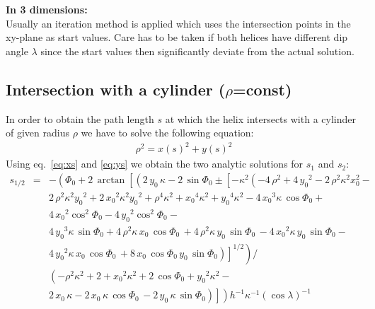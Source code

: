 \documentclass[twoside]{article}
\begin{document}
\begin{description}
{\bf In 3 dimensions:}\\
Usually an iteration method is applied which uses the intersection
points in the xy-plane as start values. Care has to be taken if both
helices have different dip angle $\lambda$ since the start values then
significantly deviate from the actual solution.

\subsection{Intersection with a cylinder ($\rho$=const)}

In order to obtain the path length $s$ at which the helix
intersects with a cylinder of given radius $\rho$ we have to solve
the following equation:
\begin{eqnarray}
    \rho^2 = x(s)^2 + y(s)^2
\end{eqnarray}
Using eq.~\ref{eq:xs} and \ref{eq:ys} we obtain the two analytic solutions for $s_1$ and $s_2$:
\begin{eqnarray} \label{eq:rsolve}
    s_{1/2} &=& -\left({\Phi_0}+2\,\arctan \left[
            \left(2\,{y_0}\,\kappa-2\,\sin{\Phi_0} \pm \left[ -
                    \kappa^2\left (-4\,\rho^2+4\,{y_0}^2 - 2\,\rho^2\kappa^2 x_0^2 -  
                    \right. \right. \right. \right. \right. \\ \nonumber
    & & \left. \left. \left. \left. \left.
                        2\,\rho^2 \kappa^2 {y_0}^{2} + 2\,{{x_0}}^{2}{\kappa}^{2}{
                            {y_0}}^{2}+{\rho}^{4}{\kappa}^{2}+{{x_0}}^{4}{\kappa}^{2}+{{y_0}}^{4}{
                            \kappa}^{2}-4\,{{x_0}}^{3}\kappa\,\cos{\Phi_0} +
                    \right. \right. \right. \right. \right. \\ \nonumber
    & & \left. \left. \left. \left. \left.
                        4\,{{x_0}}^{2}\cos^2{\Phi_0} - 4\,{{y_0}}^{2} \cos^{2}{\Phi_0} -
                    \right. \right. \right. \right. \right. \\ \nonumber
    & & \left. \left. \left. \left. \left.
                        4\,{{y_0}}
                        ^{3}\kappa\,\sin{\Phi_0}+4\,{\rho}^{2}\kappa\,{x_0}\,\cos{\Phi_0}\, + 4\,{\rho}^{2}\kappa
                        \,{y_0}\,\sin{\Phi_0}\, -4\,{{x_0}}^{2}\kappa\,{y_0}\,\sin{\Phi_0} -
                    \right. \right. \right. \right. \right. \\ \nonumber
    & & \left. \left. \left. \left. \left.
                        4\,{{y_0}}^{2}\kappa\,{x_0}\,\cos{\Phi_0}\, +8\,{x_0}\,\cos{\Phi_0}\,{y_0}\,\sin{\Phi_0}
                    \right ) \right]^{1/2} \right) /
        \right. \right. \\ \nonumber
    & & \left. \left.
            \left(
                -{\rho}^{2}{\kappa}^{2}+2+{x_0}^{2}{\kappa}^{2}+2\,\cos{\Phi_0}+{y_0}^{2}{\kappa}^{2} -
            \right. \right. \right. \\ \nonumber
    & & \left. \left. \left.
                2\,{x_0}\,\kappa-2\,{x_0}\,\kappa\,\cos{\Phi_0}\,
                -2\,{y_0}\,\kappa\,\sin{\Phi_0} \right)
        \right] \right){h}^{-1}{\kappa}^{-1}\left (
        \cos\lambda\right )^{-1}
\end{eqnarray}



\end{description}
\end{document}
